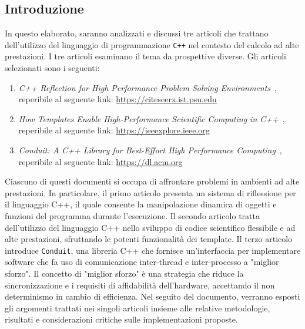 \documentclass[11pt]{article}
\begin{document}
\begin{multicols*}{2}[\columnsep=1cm]
    
    \section{Introduzione}
    In questo elaborato, saranno analizzati e discussi tre articoli che trattano dell'utilizzo del linguaggio di programmazione \texttt{C++} nel contesto del calcolo ad alte prestazioni.
    I tre articoli esaminano il tema da prospettive diverse. Gli articoli selezionati sono i seguenti:
    \begin{enumerate}
        \item \textit{C++ Reflection for High Performance Problem Solving Environments}~\cite{Article1}, reperibile al seguente link: \href{https://citeseerx.ist.psu.edu/document?repid=rep1&type=pdf&doi=2058bb40e6b80504ba1084452fd9c126cd19f891}{https://citeseerx.ist.psu.edu}
        \item \textit{How Templates Enable High-Performance Scientific Computing in C++}~\cite{Article2}, reperibile al seguente link: \href{https://ieeexplore.ieee.org/abstract/document/774843?casa_token=YqZfo7t12KoAAAAA:aUt-msPVNEAtzfVwO4h_-R_r7IPTFs7vHYHbAtsOdDE83PlNvB8gkNl5maWpHYBU5QkS3cUp0R8}{https://ieeexplore.ieee.org}
        \item \textit{Conduit: A C++ Library for Best-Effort High Performance Computing}~\cite{Article3}, reperibile al seguente link: \href{https://dl.acm.org/doi/abs/10.1145/3449726.3463205}{https://dl.acm.org}
    \end{enumerate}
    
    Ciascuno di questi documenti si occupa di affrontare problemi in ambienti ad alte prestazioni. In particolare, il primo articolo presenta un sistema di riflessione per il linguaggio C++, il quale consente la manipolazione dinamica di oggetti e funzioni del programma durante l'esecuzione. Il secondo articolo tratta dell'utilizzo del linguaggio C++ nello sviluppo di codice scientifico flessibile e ad alte prestazioni, sfruttando le potenti funzionalità dei template. Il terzo articolo introduce \texttt{Conduit}, una libreria C++ che fornisce un'interfaccia per implementare software che fa uso di comunicazione inter-thread e inter-processo a "miglior sforzo". Il concetto di "miglior sforzo" è una strategia che riduce la sincronizzazione e i requisiti di affidabilità dell'hardware, accettando il non determinismo in cambio di efficienza.
    Nel seguito del documento, verranno esposti gli argomenti trattati nei singoli articoli insieme alle relative metodologie, risultati e considerazioni critiche sulle implementazioni proposte.


\end{multicols*}
\end{document}
